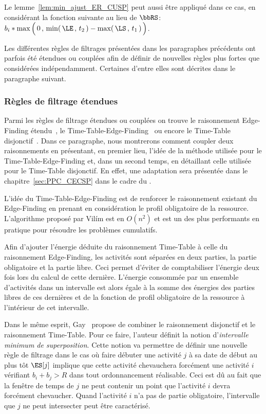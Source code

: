 Le lemme~\ref{lem:min_ajust_ER_CUSP} peut aussi être appliqué dans ce
cas, en considérant la fonction suivante au lieu de $\bbRS$:
$b_i*\max\Big(\, 0\, , \, \min(\, \LE\, ,\, t_2\,) - \max(\, \LS\, ,
  \, t_1\,) \,\Big)$. 


Les différentes règles de filtrages présentées dans les paragraphes
précédents ont parfois été étendues ou couplées afin de définir de
nouvelles règles plus fortes que considérées indépendamment. Certaines
d'entre elles sont décrites dans le paragraphe suivant. 


\subsubsection{Règles de filtrage étendues}
\label{sec:mix_CUSP}

Parmi les règles de filtrage étendues ou couplées on trouve le
raisonnement Edge-Finding étendu~\cite{ExtEF}, le
Time-Table-Edge-Finding~\cite{V11} ou encore le Time-Table
disjonctif~\cite{Gay2015}. Dans ce paragraphe, nous montrerons comment
coupler deux raisonnements en présentant, en premier lieu, l'idée de
la méthode utilisée pour le Time-Table-Edge-Finding et, dans un second
temps, en détaillant celle utilisée pour le Time-Table disjonctif. En
effet, une adaptation sera présentée dans le
chapitre~\ref{sec:PPC_CECSP} dans le cadre du \CECSP.

L'idée du Time-Table-Edge-Finding est de renforcer le raisonnement
existant du Edge-Finding en prenant en considération le profil
obligatoire de la ressource. L'algorithme proposé par Vil{\'i}m est en
$O(n^2)$ et est un des plus performants en pratique pour résoudre les
problèmes cumulatifs. 

Afin d'ajouter l'énergie déduite du raisonnement Time-Table à celle du
raisonnement Edge-Finding, les activités sont séparées en deux
parties, la partie obligatoire et la partie libre. Ceci permet
d'éviter de comptabiliser l'énergie deux fois lors du calcul de cette
dernière. L'énergie consommée par un ensemble d'activités dans un
intervalle est alors égale à la somme des énergies des parties libres
de ces dernières et de la fonction de profil obligatoire de la
ressource à l'intérieur de cet intervalle. 

Dans le même esprit, Gay~\cite{Gay2015} propose de combiner le
raisonnement disjonctif et le raisonnement Time-Table. Pour ce faire,
l'auteur définit la notion d'{\it intervalle minimum de
superposition}. Cette notion va permettre de définir une nouvelle
règle de filtrage dans le cas où faire débuter une activité $j$ à sa
date de début au plus tôt $\ES[j]$ implique que cette activité
chevauchera forcément une activité $i$ vérifiant $b_i+b_j > R$ dans
tout ordonnancement réalisable. Ceci est dû au fait que la fenêtre de
temps de $j$ ne peut contenir un point que l'activité $i$ devra
forcément chevaucher. Quand l'activité $i$ n'a pas de partie
obligatoire, l'intervalle que $j$ ne peut intersecter peut être
caractérisé.

